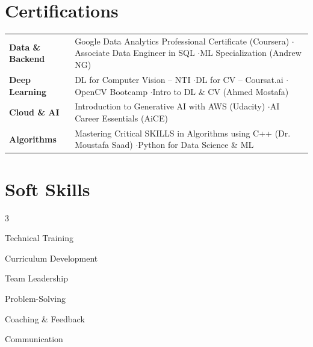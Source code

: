 \documentclass[a4paper,11pt]{article}
\begin{document}
\section{Certifications}
\vspace{2pt}
{\small
\renewcommand{\arraystretch}{1.4}
\begin{tabularx}{\textwidth}{@{\hspace{4pt}} l @{\hspace{12pt}} X @{}}
  \textbf{Data \& Backend}  & Google Data Analytics Professional Certificate (Coursera) \enspace$\cdot$\enspace Associate Data Engineer in SQL \enspace$\cdot$\enspace ML Specialization (Andrew NG) \\
  \textbf{Deep Learning}    & DL for Computer Vision -- NTI \enspace$\cdot$\enspace DL for CV -- Coursat.ai \enspace$\cdot$\enspace OpenCV Bootcamp \enspace$\cdot$\enspace Intro to DL \& CV (Ahmed Mostafa) \\
  \textbf{Cloud \& AI}      & Introduction to Generative AI with AWS (Udacity) \enspace$\cdot$\enspace AI Career Essentials (AiCE) \\
  \textbf{Algorithms}       & Mastering Critical SKILLS in Algorithms using C++ (Dr. Moustafa Saad) \enspace$\cdot$\enspace Python for Data Science \& ML \\
\end{tabularx}
}

\section{Soft Skills}
\begin{multicols}{3}
\begin{itemize}[leftmargin=0.15in]
  \small{
    \item Technical Training
    \item Curriculum Development
    \item Team Leadership
    \item Problem-Solving
    \item Coaching \& Feedback
    \item Communication
  }
\end{itemize}
\end{multicols}
\end{document}

